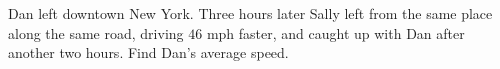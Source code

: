 Dan left downtown New York. Three hours later Sally left from the same place along the same road, driving $46$ mph faster, and caught up with Dan after another two hours. Find Dan's average speed.
